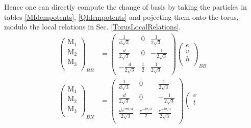 \documentclass[12pt,a4paper]{article}
\begin{document}
Hence one can directly compute the change of basis by taking the particles in tables \ref{MIdempotents}, \ref{QIdempotents} and pojecting them onto the torus, modulo the local relations in Sec. \ref{TorusLocalRelations}.
\begin{align}
\label{VAA}
\left( \begin{matrix}
\text{M}_1\\
\text{M}_2\\
\text{M}_3\\
\end{matrix} \right)_{BB} 
&= \left( \begin{matrix}
\frac{1}{d\sqrt{3}} & 0 & \frac{1}{2 \sqrt{3}} \\
\frac{d}{2 \sqrt{3}} & 0 & - \frac{1}{2 \sqrt{3}} \\
- \frac{d}{2 \sqrt{3}} & \frac{1}{2} & \frac{1}{2 \sqrt{3}}
\end{matrix} \right)
\left( \begin{matrix}
e\\
v\\
h\\
\end{matrix} \right)_{BB}\\
\label{VAP}  
\left( \begin{matrix}
\text{M}_1\\
\text{M}_2\\
\text{M}_3\\
\end{matrix} \right)_{BN}
&= \left( \begin{matrix}
\frac{1}{d\sqrt{3}} & 0 & \frac{1}{2 \sqrt{3}} \\
\frac{d}{2 \sqrt{3}} & 0 & - \frac{1}{2 \sqrt{3}} \\
\frac{d e^{2 \pi i/3}}{2 \sqrt{3}} & \frac{e^{- i \pi /3}}{2} & \frac{e^{- i \pi /3}}{2 \sqrt{3}}\\
\end{matrix} \right)
\left( \begin{matrix}
e\\
t\\

\end{matrix}
\end{align}
\end{document}
